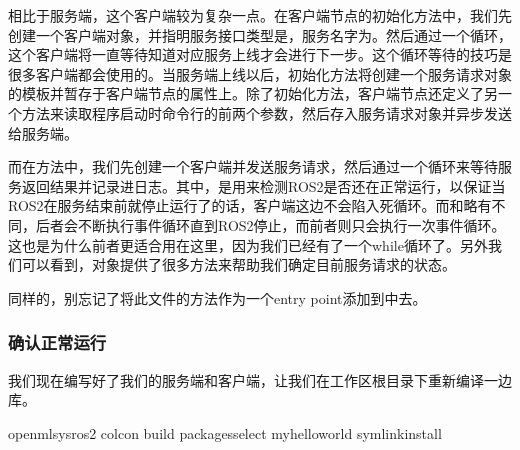 \documentclass[letterpaper,10pt,english]{sphinxmanual}
\begin{document}
\sphinxAtStartPar
相比于服务端，这个客户端较为复杂一点。在客户端节点的初始化方法中，我们先创建一个客户端对象，并指明服务接口类型是，服务名字为。然后通过一个循环，这个客户端将一直等待知道对应服务上线才会进行下一步。这个循环等待的技巧是很多客户端都会使用的。当服务端上线以后，初始化方法将创建一个服务请求对象的模板并暂存于客户端节点的属性上。除了初始化方法，客户端节点还定义了另一个方法来读取程序启动时命令行的前两个参数，然后存入服务请求对象并异步发送给服务端。

\sphinxAtStartPar
而在方法中，我们先创建一个客户端并发送服务请求，然后通过一个循环来等待服务返回结果并记录进日志。其中，是用来检测ROS2是否还在正常运行，以保证当ROS2在服务结束前就停止运行了的话，客户端这边不会陷入死循环。而和略有不同，后者会不断执行事件循环直到ROS2停止，而前者则只会执行一次事件循环。这也是为什么前者更适合用在这里，因为我们已经有了一个while循环了。另外我们可以看到，对象提供了很多方法来帮助我们确定目前服务请求的状态。

\sphinxAtStartPar
同样的，别忘记了将此文件的方法作为一个entry
point添加到中去。

\begin{sphinxVerbatim}[commandchars=\\\{\}]
\end{sphinxVerbatim}


\subsubsection{确认正常运行}
\label{\detokenize{chapter_rl_sys/ros_code_ex:id13}}
\sphinxAtStartPar
我们现在编写好了我们的服务端和客户端，让我们在工作区根目录下重新编译一边库。

\begin{sphinxVerbatim}[commandchars=\\\{\}]
 openmlsys\PYGZhy{}ros2
colcon build \PYGZhy{}\PYGZhy{}packages\PYGZhy{}select my\PYGZus{}hello\PYGZus{}world \PYGZhy{}\PYGZhy{}symlink\PYGZhy{}install
\end{sphinxVerbatim}
\end{document}
